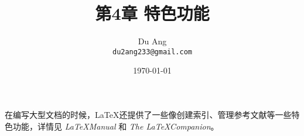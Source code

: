 \documentclass[UTF8]{ctexart}
\title{\heiti 第4章 \quad 特色功能}
\author{\kaishu Du Ang \\ \texttt{du2ang233@gmail.com} }
\date{\today}
\begin{document}
\maketitle

\tableofcontents

\newpage

在编写大型文档的时候，\LaTeX 还提供了一些像创建索引、管理参考文献等一些特色功能，详情见 \emph{\LaTeX Manual} 和
\emph{The \LaTeX Companion}。
\end{document}
